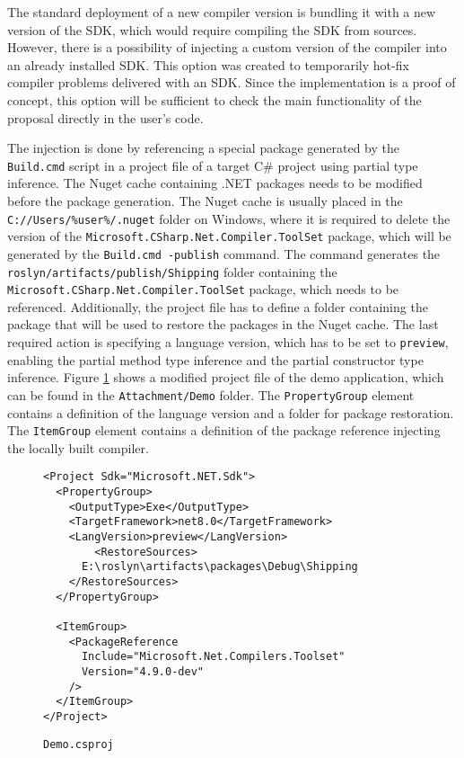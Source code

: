 The standard deployment of a new compiler version is bundling it with a new version of the SDK, which would require compiling the SDK from sources. 
However, there is a possibility of injecting a custom version of the compiler into an already installed SDK. 
This option was created to temporarily hot-fix compiler problems delivered with an SDK. 
Since the implementation is a proof of concept, this option will be sufficient to check the main functionality of the proposal directly in the user’s code.
\par
The injection is done by referencing a special package generated by the\\ \texttt{Build.cmd} script in a project file of a target C\# project using partial type inference. The Nuget cache containing .NET packages needs to be modified before the package generation. 
The Nuget cache is usually placed in the\\ \texttt{C://Users/\%user\%/.nuget} folder on Windows, where it is required to delete the version of the \texttt{Microsoft.CSharp.Net.Compiler.ToolSet} package, which will be generated by the \texttt{Build.cmd -publish} command. 
The command generates the \texttt{roslyn/artifacts/publish/Shipping} folder containing the\\ \texttt{Microsoft.CSharp.Net.Compiler.ToolSet} package, which needs to be referenced. 
Additionally, the project file has to define a folder containing the package that will be used to restore the packages in the Nuget cache. 
The last required action is specifying a language version, which has to be set to \texttt{preview}, enabling the partial method type inference and the partial constructor type inference. 
Figure \ref{img68:csproj} shows a modified project file of the demo application, which can be found in the \texttt{Attachment/Demo} folder. 
The \texttt{PropertyGroup} element contains a definition of the language version and a folder for package restoration. 
The \texttt{ItemGroup} element contains a definition of the package reference injecting the locally built compiler.
\begin{figure}[h]
\begin{lstlisting}
<Project Sdk="Microsoft.NET.Sdk">
  <PropertyGroup>
    <OutputType>Exe</OutputType>
    <TargetFramework>net8.0</TargetFramework>
    <LangVersion>preview</LangVersion>
        <RestoreSources>
      E:\roslyn\artifacts\packages\Debug\Shipping
    </RestoreSources>
  </PropertyGroup>

  <ItemGroup>
    <PackageReference 
      Include="Microsoft.Net.Compilers.Toolset" 
      Version="4.9.0-dev"
    />
  </ItemGroup>
</Project>
\end{lstlisting}
\caption{\texttt{Demo.csproj}}
\label{img68:csproj}
\end{figure}
